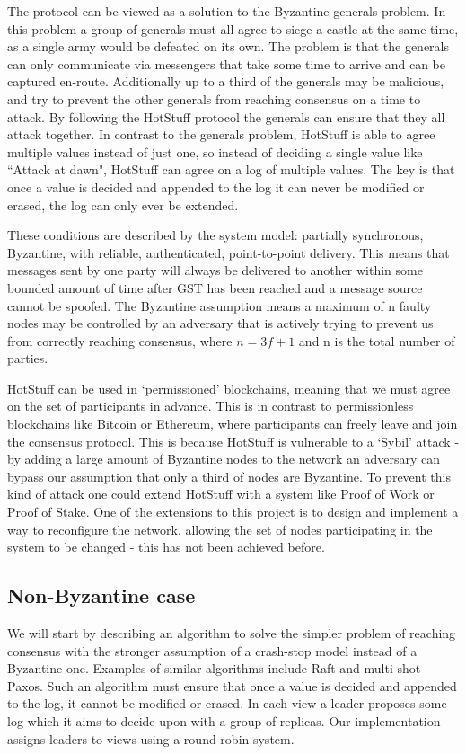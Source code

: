 The protocol can be viewed as a solution to the Byzantine generals problem. In this problem a group of generals must all agree to siege a castle at the same time, as a single army would be defeated on its own. The problem is that the generals can only communicate via messengers that take some time to arrive and can be captured en-route. Additionally up to a third of the generals may be malicious, and try to prevent the other generals from reaching consensus on a time to attack. By following the HotStuff protocol the generals can ensure that they all attack together. In contrast to the generals problem, HotStuff is able to agree multiple values instead of just one, so instead of deciding a single value like ``Attack at dawn", HotStuff can agree on a log of multiple values. The key is that once a value is decided and appended to the log it can never be modified or erased, the log can only ever be extended.

These conditions are described by the system model: partially synchronous, Byzantine, with reliable, authenticated, point-to-point delivery. This means that messages sent by one party will always be delivered to another within some bounded amount of time after GST has been reached and a message source cannot be spoofed. The Byzantine assumption means a maximum of n faulty nodes may be controlled by an adversary that is actively trying to prevent us from correctly reaching consensus, where $n = 3f + 1$ and n is the total number of parties.

HotStuff can be used in `permissioned' blockchains, meaning that we must agree on the set of participants in advance. This is in contrast to permissionless blockchains like Bitcoin or Ethereum, where participants can freely leave and join the consensus protocol. This is because HotStuff is vulnerable to a `Sybil' attack - by adding a large amount of Byzantine nodes to the network an adversary can bypass our assumption that only a third of nodes are Byzantine. To prevent this kind of attack one could extend HotStuff with a system like Proof of Work or Proof of Stake. One of the extensions to this project is to design and implement a way to reconfigure the network, allowing the set of nodes participating in the system to be changed - this has not been achieved before.

\subsection{Non-Byzantine case}
We will start by describing an algorithm to solve the simpler problem of reaching consensus with the stronger assumption of a crash-stop model instead of a Byzantine one. Examples of similar algorithms include Raft and multi-shot Paxos. Such an algorithm must ensure that once a value is decided and appended to the log, it cannot be modified or erased. In each view a leader proposes some log which it aims to decide upon with a group of replicas. Our implementation assigns leaders to views using a round robin system.

